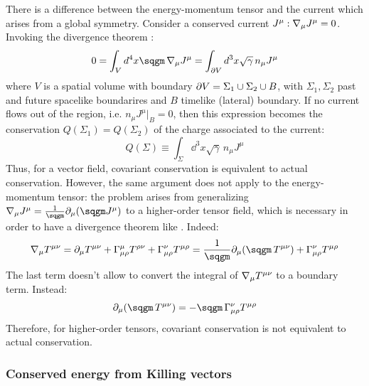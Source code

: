 There is a difference between the energy-momentum tensor and the current which arises from a global symmetry. Consider a conserved current $ J^\mu : \nabla_\mu J^\mu = 0 $. Invoking the divergence theorem :
\begin{equation*}
  0 = \int_V d^4 x \sqgm\, \na_\mu J^\mu = \int_{\pa V} d^3 x \sqrt{\gamma}\, n_{\mu} J^\mu
\end{equation*}
where $ V $ is a spatial volume with boundary $ \partial V = \Sigma_1 \cup \Sigma_2 \cup B $, with $ \Sigma_1, \Sigma_2 $ past and future spacelike boundarires and $ B $ timelike (lateral) boundary. If no current flows out of the region, i.e. $ n_\mu J^\mu \vert_B = 0 $, then this expression becomes the conservation $ Q(\Sigma_1) = Q(\Sigma_2) $ of the charge associated to the current:
\begin{equation*}
  Q(\Sigma) \equiv \int_\Sigma \dd^3 x \sqrt{\gamma}\, n_\mu J^\mu
\end{equation*}
Thus, for a vector field, covariant conservation is equivalent to actual conservation.
However, the same argument does not apply to the energy-momentum tensor: the problem arises from generalizing $ \na_\mu J^\mu = \frac{1}{\sqgm} \pa_\mu (\sqgm J^\mu) $ to a higher-order tensor field, which is necessary in order to have a divergence theorem like . Indeed:
\begin{equation*}
  \na_\mu T^{\mu \nu} = \pa_\mu T^{\mu \nu} + \Gamma^\mu_{\mu \rho} T^{\rho \nu} + \Gamma^\nu_{\mu \rho} T^{\mu \rho} = \frac{1}{\sqgm} \pa_\mu (\sqgm\, T^{\mu \nu}) + \Gamma^\nu_{\mu \rho} T^{\mu \rho}
\end{equation*}
The last term doesn't allow to convert the integral of $ \nabla_\mu T^{\mu \nu} $ to a boundary term. Instead:
\begin{equation}
  \pa_\mu (\sqgm\, T^{\mu \nu}) = -\sqgm\, \Gamma^\nu_{\mu \rho} T^{\mu \rho}
  \label{eq:no-div-th}
\end{equation}
Therefore, for higher-order tensors, covariant conservation is not equivalent to actual conservation.

\subsubsection{Conserved energy from Killing vectors}

